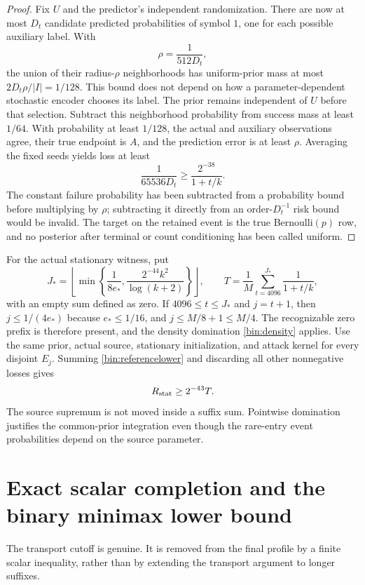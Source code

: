 \begin{proof}
Fix $U$ and the predictor's independent randomization. There are now at most $D_t$ candidate predicted probabilities of symbol $1$, one for each possible auxiliary label. With
\[
 \rho=\frac1{512D_t},
\]
the union of their radius-$\rho$ neighborhoods has uniform-prior mass at most $2D_t\rho/|I|=1/128$. This bound does not depend on how a parameter-dependent stochastic encoder chooses its label. The prior remains independent of $U$ before that selection. Subtract this neighborhood probability from success mass at least $1/64$. With probability at least $1/128$, the actual and auxiliary observations agree, their true endpoint is $A$, and the prediction error is at least $\rho$. Averaging the fixed seeds yields loss at least
\[
 \frac1{65536D_t}\ge\frac{2^{-38}}{1+t/k}.
\]
The constant failure probability has been subtracted from a probability bound before multiplying by $\rho$; subtracting it directly from an order-$D_t^{-1}$ risk bound would be invalid. The target on the retained event is the true Bernoulli$(p)$ row, and no posterior after terminal or count conditioning has been called uniform.
\end{proof}

For the actual stationary witness, put
\begin{equation}
 J_* =\left\lfloor\min\left\{\frac1{8e_*},
                      \frac{2^{-44}k^2}{\log(k+2)}\right\}\right\rfloor,
 \qquad
 T=\frac1M\sum_{t=4096}^{J_*}\frac1{1+t/k},
 \label{bin:sumdefinition}
\end{equation}
with an empty sum defined as zero. If $4096\le t\le J_*$ and $j=t+1$, then $j\le1/(4e_*)$ because $e_*\le1/16$, and $j\le M/8+1\le M/4$. The recognizable zero prefix is therefore present, and the density domination \eqref{bin:density} applies. Use the same prior, actual source, stationary initialization, and attack kernel for every disjoint $E_j$. Summing \eqref{bin:referencelower} and discarding all other nonnegative losses gives
\begin{equation}
 R_{\rm stat}\ge2^{-43}T.
 \label{bin:sumbound}
\end{equation}
The source supremum is not moved inside a suffix sum. Pointwise domination justifies the common-prior integration even though the rare-entry event probabilities depend on the source parameter.

\section{Exact scalar completion and the binary minimax lower bound}
\label{bin:completion}
The transport cutoff is genuine. It is removed from the final profile by a finite scalar inequality, rather than by extending the transport argument to longer suffixes.

